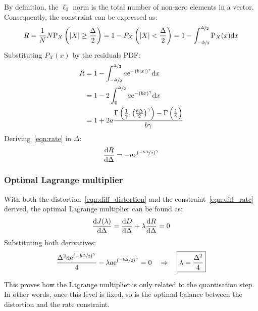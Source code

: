 \documentclass[11pt,a4paper,openright,twoside]{book}
\numberwithin{equation}{section} %
\numberwithin{figure}{section} %
\numberwithin{table}{section} %
\begin{document}
By definition, the $\ell_0$ norm is the total number of non-zero
elements in a vector.
Consequently, the constraint can be expressed as:
\begin{equation}
	R 
	= \frac{1}{N} N \text{P}_X\left(\vert X \vert \ge \frac{\Delta}{2}\right)
	= 1-P_X\left(\vert X \vert < \frac{\Delta}{2}\right)
	= 1-\int_{\nicefrac{-\Delta}{2}}^{\nicefrac{\Delta}{2}}\text{P}_X(x)\text{d} x
	\label{eqn:int_rate}
\end{equation}
Substituting $P_X(x)$ by the residuals \ac{PDF}:
\begin{align}
	R
	&=1-\int_{\nicefrac{-\Delta}{2}}^{\nicefrac{\Delta}{2}}
	a \text{e}^{-{\left(b\vert x \vert\right)}^\gamma} \text{d} x \\
	&=1-2\int_0^{\nicefrac{\Delta}{2}}
	a \text{e}^{-{\left(b x \right)}^\gamma} \text{d} x \\
	&=1+2a\frac{\Gamma\left(
		\frac{1}{\gamma},{\left(\frac{b\Delta}{2}\right)}^\gamma\right)-
		\Gamma\left(\frac{1}{\gamma}\right)}
		{b\gamma}
	\label{eqn:rate}
\end{align}
Deriving~\eqref{eqn:rate} in $\Delta$:
\begin{equation}
	\frac{\text{d} R}{\text{d}\Delta} =
	-a\text{e}^{{\left(\nicefrac{-b\Delta}{2}\right)}^\gamma}
	\label{eqn:diff_rate}
\end{equation}
\subsubsection{Optimal Lagrange multiplier}
\label{ssub:optimal_lagrange_multiplier}

With both the distortion~\eqref{eqn:diff_distortion} and the
constraint~\eqref{eqn:diff_rate} derived, the optimal Lagrange
multiplier can be found as:
\begin{equation}
	\frac{\text{d} J(\lambda)}{\text{d} \Delta}
	= \frac{\text{d} D}{\text{d} \Delta} +
	\lambda \frac{\text{d} R}{\text{d} \Delta} = 0 \\
	\label{eqn:diff_lagrange_multiplier}
\end{equation}
Substituting both derivatives:
\begin{equation}
	\frac{\Delta^2 a \text{e}^{{(-b\nicefrac{\Delta}{2})}^\gamma}}{4}
	- \lambda
	a\text{e}^{{\left(\nicefrac{-b\Delta}{2}\right)}^\gamma} = 0
	\quad \Rightarrow \quad \boxed{\lambda = \frac{\Delta^2}{4}}
\end{equation}

This proves how the Lagrange multiplier is only related to the quantisation
step.
In other words, once this level is fixed, so is the optimal balance between
the distortion and the rate constraint.
\end{document}
